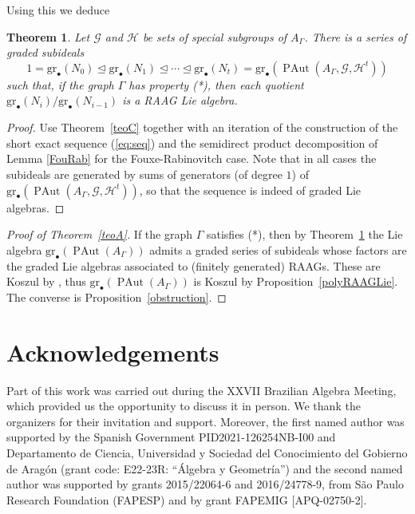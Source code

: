 \documentclass[10pt]{amsart}
\newtheorem{theorem}{Theorem}[section]
\theoremstyle{definition}
\newcommand{\PAut}{\operatorname{PAut}}
\newcommand{\gr}{\mathrm{gr}_\bullet}
\theoremstyle{definition}
\numberwithin{equation}{section}
\begin{document}
Using this we deduce


 \begin{theorem}\label{polyRAAGLieSeries} Let $\mathcal{G}$ and $\mathcal{H}$ be sets of special subgroups of $A_\Gamma$. There is a series of graded subideals
 \[1=\gr(N_0)\trianglelefteq\gr(N_1)\trianglelefteq\cdots\trianglelefteq\gr(N_t)=\gr(\PAut(A_\Gamma,\mathcal{G},\mathcal{H}^t))\]
such that, if  the graph $\Gamma$ has property (*), then each quotient $\gr(N_i)/\gr(N_{i-1})$ is a RAAG Lie algebra.
 \end{theorem}
\begin{proof} Use  Theorem~\ref{teoC} together with an iteration of the construction of the short exact sequence (\ref{eq:seq}) and  the semidirect product decomposition of Lemma \ref{FouRab} for the Fouxe-Rabinovitch case. Note that in all cases the subideals are generated by sums of generators (of degree $1$) of $\gr(\PAut(A_\Gamma,\mathcal{G},\mathcal{H}^t))$, so that the sequence is indeed of graded Lie algebras.
\end{proof}


 

\begin{proof}[Proof of Theorem~\ref{teoA}]
If the graph $\Gamma$ satisfies (*), then by Theorem~\ref{polyRAAGLieSeries} the Lie algebra $\gr(\PAut(A_{\Gamma}))$  admits a graded series of subideals whose factors are the graded Lie algebras associated to (finitely generated) RAAGs. These are Koszul by \cite{Froberg}, thus $\gr(\PAut(A_{\Gamma}))$ is Koszul by Proposition~\ref{polyRAAGLie}. The converse is Proposition~\ref{obstruction}.
\end{proof}


\section*{Acknowledgements}
Part of this work was carried out during the XXVII Brazilian Algebra Meeting, which provided us the opportunity to discuss it in person. We thank the organizers for their invitation and support.
Moreover, the first named author was supported by the Spanish Government PID2021-126254NB-I00 and Departamento de Ciencia, Universidad y Sociedad del 
Conocimiento del Gobierno de Arag{\'o}n (grant code: E22-23R: ``{\'A}lgebra y Geometr{\'i}a'') and the second named author was supported by grants 2015/22064-6 and 2016/24778-9, from São Paulo Research Foundation (FAPESP) and by grant FAPEMIG [APQ-02750-2].
\end{document}
